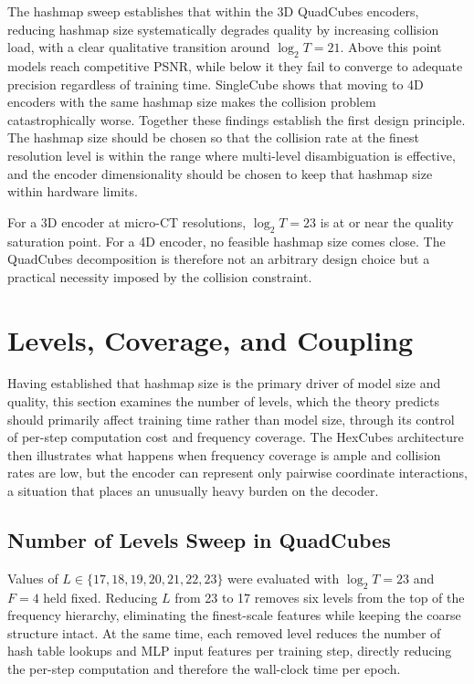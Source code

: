 \documentclass[12pt, a4paper, twoside]{report}
\begin{document}
The hashmap sweep establishes that within the 3D QuadCubes encoders, reducing hashmap size systematically degrades quality by increasing collision load, with a clear qualitative transition around $\log_2 T = 21$. Above this point models reach competitive PSNR, while below it they fail to converge to adequate precision regardless of training time. SingleCube shows that moving to 4D encoders with the same hashmap size makes the collision problem catastrophically worse. Together these findings establish the first design principle. The hashmap size should be chosen so that the collision rate at the finest resolution level is within the range where multi-level disambiguation is effective, and the encoder dimensionality should be chosen to keep that hashmap size within hardware limits.

For a 3D encoder at micro-CT resolutions, $\log_2 T = 23$ is at or near the quality saturation point. For a 4D encoder, no feasible hashmap size comes close. The QuadCubes decomposition is therefore not an arbitrary design choice but a practical necessity imposed by the collision constraint.

\section{Levels, Coverage, and Coupling}
\label{sec:levels_and_coupling}

Having established that hashmap size is the primary driver of model size and quality, this section examines the number of levels, which the theory predicts should primarily affect training time rather than model size, through its control of per-step computation cost and frequency coverage. The HexCubes architecture then illustrates what happens when frequency coverage is ample and collision rates are low, but the encoder can represent only pairwise coordinate interactions, a situation that places an unusually heavy burden on the decoder.

\subsection{Number of Levels Sweep in QuadCubes}
\label{subsec:levels_sweep}

Values of $L \in \{17, 18, 19, 20, 21, 22, 23\}$ were evaluated with $\log_2 T = 23$ and $F = 4$ held fixed. Reducing $L$ from 23 to 17 removes six levels from the top of the frequency hierarchy, eliminating the finest-scale features while keeping the coarse structure intact. At the same time, each removed level reduces the number of hash table lookups and MLP input features per training step, directly reducing the per-step computation and therefore the wall-clock time per epoch.
\end{document}
